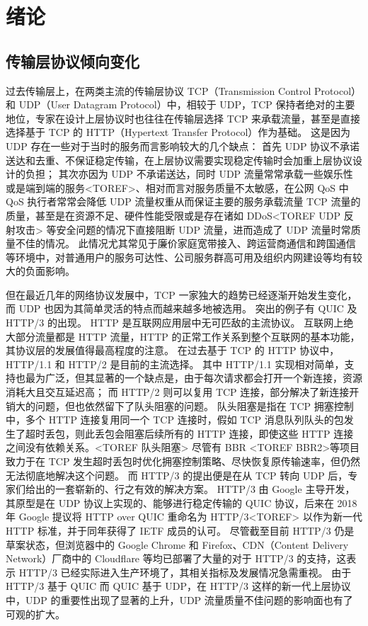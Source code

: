 

\chapter{绪论}

\section{传输层协议倾向变化}

过去传输层上，在两类主流的传输层协议 TCP（Transmission Control Protocol）和 UDP（User Datagram Protocol）中，相较于 UDP，TCP 保持者绝对的主要地位，专家在设计上层协议时也往往在传输层选择 TCP 来承载流量，甚至是直接选择基于 TCP 的 HTTP（Hypertext Transfer Protocol）作为基础。
这是因为 UDP 存在一些对于当时的服务而言影响较大的几个缺点：
首先 UDP 协议不承诺送达和去重\cite{rfc768}、不保证稳定传输，在上层协议需要实现稳定传输时会加重上层协议设计的负担；
其次亦因为 UDP 不承诺送达，同时 UDP 流量常常承载一些娱乐性或是端到端的服务<TOREF>、相对而言对服务质量不太敏感，在公网 QoS 中 QoS 执行者常常会降低 UDP 流量权重从而保证主要的服务承载流量 TCP 流量的质量，甚至是在资源不足、硬件性能受限或是存在诸如 DDoS<TOREF UDP 反射攻击> 等安全问题的情况下直接阻断 UDP 流量，进而造成了 UDP 流量时常质量不佳的情况。
此情况尤其常见于廉价家庭宽带接入、跨运营商通信和跨国通信等环境中，对普通用户的服务可达性、公司服务群高可用及组织内网建设等均有较大的负面影响。

但在最近几年的网络协议发展中，TCP 一家独大的趋势已经逐渐开始发生变化，而 UDP 也因为其简单灵活的特点而越来越多地被选用。
突出的例子有 QUIC 及 HTTP/3 的出现。
HTTP 是互联网应用层中无可匹敌的主流协议。
互联网上绝大部分流量都是 HTTP 流量，HTTP 的正常工作关系到整个互联网的基本功能，其协议层的发展值得最高程度的注意。
在过去基于 TCP 的 HTTP 协议中，HTTP/1.1 和 HTTP/2 是目前的主流选择。
其中 HTTP/1.1 实现相对简单，支持也最为广泛，但其显著的一个缺点是，由于每次请求都会打开一个新连接，资源消耗大且交互延迟高；
而 HTTP/2 则可以复用 TCP 连接，部分解决了新连接开销大的问题，但也依然留下了队头阻塞的问题。
队头阻塞是指在 TCP 拥塞控制中，多个 HTTP 连接复用同一个 TCP 连接时，假如 TCP 消息队列队头的包发生了超时丢包，则此丢包会阻塞后续所有的 HTTP 连接，即使这些 HTTP 连接之间没有依赖关系。<TOREF 队头阻塞>
尽管有 BBR\cite{45646} <TOREF BBR2>等项目致力于在 TCP 发生超时丢包时优化拥塞控制策略、尽快恢复原传输速率，但仍然无法彻底地解决这个问题。
而 HTTP/3 的提出便是在从 TCP 转向 UDP 后，专家们给出的一套崭新的、行之有效的解决方案。
HTTP/3 由 Google 主导开发，其原型是在 UDP 协议上实现的、能够进行稳定传输的 QUIC 协议，后来在 2018 年 Google 提议将 HTTP over QUIC 重命名为 HTTP/3<TOREF> 以作为新一代 HTTP 标准，并于同年获得了 IETF 成员的认可。
尽管截至目前 HTTP/3 仍是草案状态\cite{ietf-quic-http-34}，但浏览器中的 Google Chrome 和 Firefox、CDN（Content Delivery Network）厂商中的 Cloudflare 等均已部署了大量的对于 HTTP/3 的支持，这表示 HTTP/3 已经实际进入生产环境了，其相关指标及发展情况急需重视。
由于 HTTP/3 基于 QUIC 而 QUIC 基于 UDP，在 HTTP/3 这样的新一代上层协议中，UDP 的重要性出现了显著的上升，UDP 流量质量不佳问题的影响面也有了可观的扩大。

